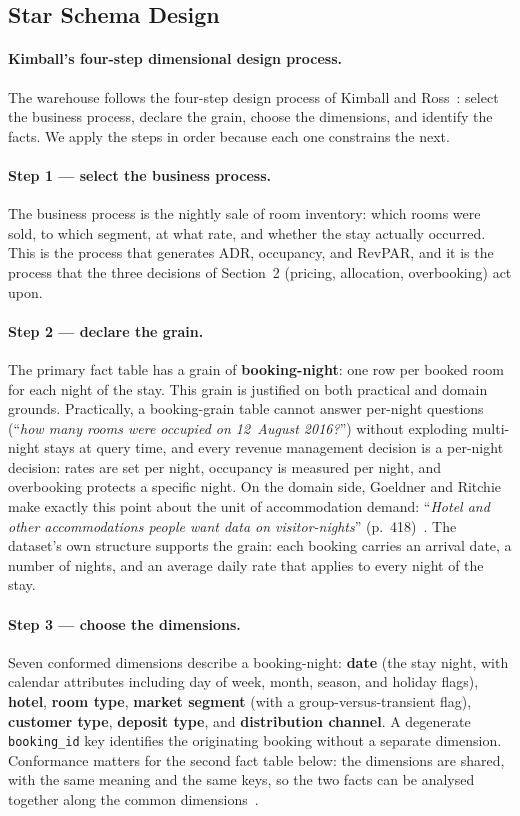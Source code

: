 \subsection{Star Schema Design}

\paragraph{Kimball's four-step dimensional design process.}
The warehouse follows the four-step design process of Kimball and Ross~\cite{kimball2013}: select the business process, declare the grain, choose the dimensions, and identify the facts. We apply the steps in order because each one constrains the next.

\paragraph{Step 1 --- select the business process.}
The business process is the nightly sale of room inventory: which rooms were sold, to which segment, at what rate, and whether the stay actually occurred. This is the process that generates ADR, occupancy, and RevPAR, and it is the process that the three decisions of Section~2 (pricing, allocation, overbooking) act upon.

\paragraph{Step 2 --- declare the grain.}
The primary fact table has a grain of \textbf{booking-night}: one row per booked room for each night of the stay. This grain is justified on both practical and domain grounds. Practically, a booking-grain table cannot answer per-night questions (``\emph{how many rooms were occupied on 12~August 2016?}'') without exploding multi-night stays at query time, and every revenue management decision is a per-night decision: rates are set per night, occupancy is measured per night, and overbooking protects a specific night. On the domain side, Goeldner and Ritchie make exactly this point about the unit of accommodation demand: ``\emph{Hotel and other accommodations people want data on visitor-nights}'' (p.~418)~\cite{goeldner2009}. The dataset's own structure supports the grain: each booking carries an arrival date, a number of nights, and an average daily rate that applies to every night of the stay.

\paragraph{Step 3 --- choose the dimensions.}
Seven conformed dimensions describe a booking-night: \textbf{date} (the stay night, with calendar attributes including day of week, month, season, and holiday flags), \textbf{hotel}, \textbf{room type}, \textbf{market segment} (with a group-versus-transient flag), \textbf{customer type}, \textbf{deposit type}, and \textbf{distribution channel}. A degenerate \texttt{booking\_id} key identifies the originating booking without a separate dimension. Conformance matters for the second fact table below: the dimensions are shared, with the same meaning and the same keys, so the two facts can be analysed together along the common dimensions~\cite{kimball2013}.

